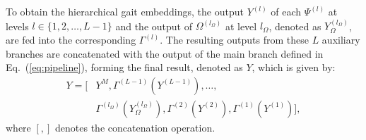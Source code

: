 \documentclass[10pt,twocolumn,letterpaper]{article}
\begin{document}
To obtain the hierarchical gait embeddings, the output $Y^{(l)}$ of each $\Psi^{(l)}$ at levels $l \in \{1, 2, \ldots, L-1\}$ and the output of $\Omega^{(l_{\Omega})}$ at level $l_{\Omega}$, denoted as $Y_{\Omega}^{(l_{\Omega})}$,  are fed into the corresponding $\Gamma^{(l)}$. The resulting outputs from these $L$ auxiliary branches are concatenated with the output of the main branch defined in Eq.~(\ref{eq:pipeline}), forming the final result, denoted as $Y$, which is given by:
\begin{align}
  Y =  \biggl[ & Y^{M}, \Gamma^{(L-1)}\left(Y^{(L-1)}\right),  \ldots , \nonumber \\
  & \Gamma^{(l_{\Omega})}\left(Y_{\Omega}^{(l_{\Omega})}\right), \Gamma^{(2)}\left(Y^{(2)}\right), \Gamma^{(1)}\left(Y^{(1)}\right) \biggl],
\end{align}
where $[,]$ denotes the concatenation operation.









\end{document}

